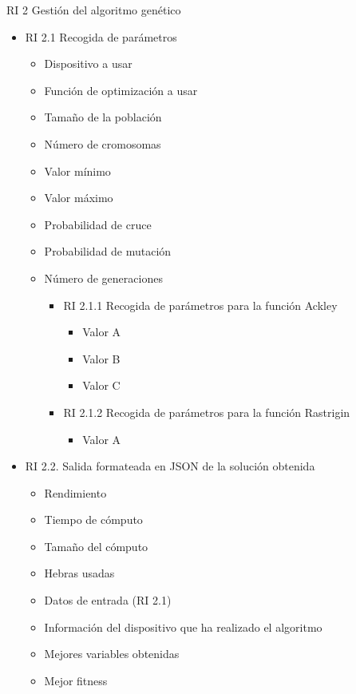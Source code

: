 RI 2 Gestión del algoritmo genético

\begin{itemize}
	\item RI 2.1 Recogida de parámetros 
	
	\begin{itemize}
		\item Dispositivo a usar
		\item Función de optimización a usar
		\item Tamaño de la población
		\item Número de cromosomas
		\item Valor mínimo
		\item Valor máximo
		\item Probabilidad de cruce
		\item Probabilidad de mutación
		\item Número de generaciones
		\begin{itemize}
			\item RI 2.1.1 Recogida de parámetros para la función Ackley
			\begin{itemize}
				\item Valor A
				\item Valor B
				\item Valor C
			\end{itemize}
			
			\item RI 2.1.2 Recogida de parámetros para la función Rastrigin
			\begin{itemize}
				\item Valor A
			\end{itemize}
		\end{itemize}
	\end{itemize}
	
	
	\item RI 2.2. Salida formateada en JSON de la solución obtenida
	\begin{itemize}
		\item Rendimiento
		\item Tiempo de cómputo
		\item Tamaño del cómputo
		\item Hebras usadas
		\item Datos de entrada (RI 2.1)
		\item Información del dispositivo que ha realizado el algoritmo
		\item Mejores variables obtenidas
		\item Mejor fitness
	\end{itemize}
	
\end{itemize}


